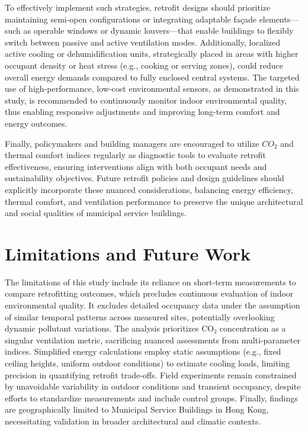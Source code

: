 \documentclass[preprint,12pt]{elsarticle}
\begin{document}
To effectively implement such strategies, retrofit designs should prioritize maintaining semi-open configurations or integrating adaptable façade elements—such as operable windows or dynamic louvers—that enable buildings to flexibly switch between passive and active ventilation modes. Additionally, localized active cooling or dehumidification units, strategically placed in areas with higher occupant density or heat stress (e.g., cooking or serving zones), could reduce overall energy demands compared to fully enclosed central systems. The targeted use of high-performance, low-cost environmental sensors, as demonstrated in this study, is recommended to continuously monitor indoor environmental quality, thus enabling responsive adjustments and improving long-term comfort and energy outcomes.

Finally, policymakers and building managers are encouraged to utilize $CO_2$ and thermal comfort indices regularly as diagnostic tools to evaluate retrofit effectiveness, ensuring interventions align with both occupant needs and sustainability objectives. Future retrofit policies and design guidelines should explicitly incorporate these nuanced considerations, balancing energy efficiency, thermal comfort, and ventilation performance to preserve the unique architectural and social qualities of municipal service buildings.

\section{Limitations and Future Work}

The limitations of this study include its reliance on short-term measurements to compare retrofitting outcomes, which precludes continuous evaluation of indoor environmental quality. It excludes detailed occupancy data under the assumption of similar temporal patterns across measured sites, potentially overlooking dynamic pollutant variations. The analysis prioritizes CO₂ concentration as a singular ventilation metric, sacrificing nuanced assessments from multi-parameter indices. Simplified energy calculations employ static assumptions (e.g., fixed ceiling heights, uniform outdoor conditions) to estimate cooling loads, limiting precision in quantifying retrofit trade-offs. Field experiments remain constrained by unavoidable variability in outdoor conditions and transient occupancy, despite efforts to standardize measurements and include control groups. Finally, findings are geographically limited to Municipal Service Buildings in Hong Kong, necessitating validation in broader architectural and climatic contexts.
\end{document}
